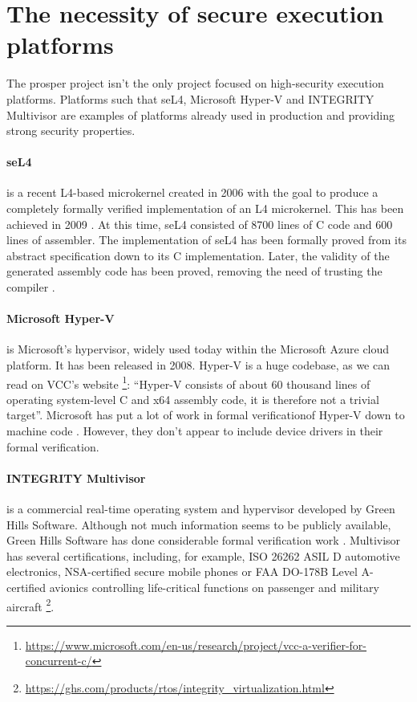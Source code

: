 \documentclass{kththesis}
\begin{document}
\section{The necessity of secure execution platforms}

The \acrshort{prosper} project isn't the only project focused on high-security execution platforms. Platforms such that seL4, Microsoft Hyper-V and INTEGRITY Multivisor are examples of platforms already used in production and providing strong security properties.

\paragraph{seL4} is a recent L4-based microkernel created in 2006 with the goal to produce a completely formally verified implementation of an L4 microkernel. This has been achieved in 2009 \cite{klein_sel4:_2009}. At this time, seL4 consisted of \num{8700} lines of C code and \num{600} lines of assembler. The implementation of seL4 has been formally proved from its abstract specification down to its C implementation. Later, the validity of the generated assembly code has been proved, removing the need of trusting the compiler \cite{noauthor_what_nodate}.

\paragraph{Microsoft Hyper-V} is Microsoft's hypervisor, widely used today within the Microsoft Azure cloud platform. It has been released in 2008. Hyper-V is a huge codebase, as we can read on VCC's website \footnote{\url{https://www.microsoft.com/en-us/research/project/vcc-a-verifier-for-concurrent-c/}}: ``Hyper-V consists of about 60 thousand lines of operating system-level C and x64 assembly code, it is therefore not a trivial target''. Microsoft has put a lot of work in formal verification\footnotemark of Hyper-V down to machine code \cite{leinenbach_verifying_2009}. However, they don't appear to include device drivers in their formal verification.


\paragraph{INTEGRITY Multivisor} is a commercial real-time operating system and hypervisor developed by Green Hills Software. Although not much information seems to be publicly available, Green Hills Software has done considerable formal verification work \cite{richards_modeling_2010}. Multivisor has several certifications, including, for example, ISO 26262 ASIL D automotive electronics, NSA-certified secure mobile phones or FAA DO-178B Level A-certified avionics controlling life-critical functions on passenger and military aircraft \footnote{\url{https://ghs.com/products/rtos/integrity_virtualization.html}}.
\end{document}
